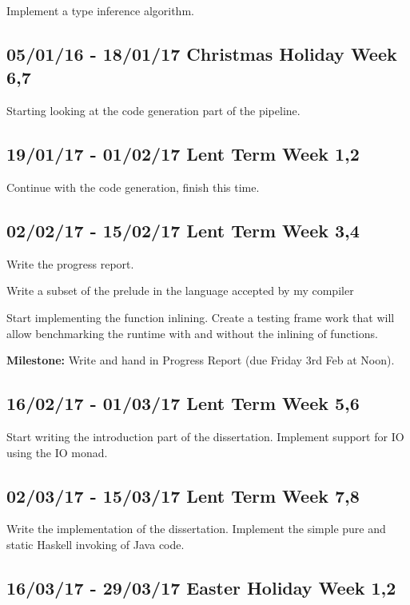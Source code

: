 \documentclass[a4paper]{article}
\begin{document}
      Implement a type inference algorithm.

    \subsection*{05/01/16 - 18/01/17 \hfill Christmas Holiday Week 6,7}

      Starting looking at the code generation part of the pipeline.


    \subsection*{19/01/17 - 01/02/17 \hfill Lent Term Week 1,2}

      Continue with the code generation, finish this time.


    \subsection*{02/02/17 - 15/02/17 \hfill Lent Term Week 3,4}


      Write the progress report.

      Write a subset of the prelude in the language accepted by my compiler

      Start implementing the function inlining. Create a testing frame work that will allow benchmarking the runtime with and without the 
      inlining of functions.


      \textbf{Milestone:} Write and hand in Progress Report (due Friday 3rd Feb at Noon).

    \subsection*{16/02/17 - 01/03/17 \hfill Lent Term Week 5,6}

      Start writing the introduction part of the dissertation. Implement support for IO using the IO monad.

    \subsection*{02/03/17 - 15/03/17 \hfill Lent Term Week 7,8}

      Write the implementation of the dissertation. Implement the simple pure and static Haskell invoking of Java code.


    \subsection*{16/03/17 - 29/03/17 \hfill Easter Holiday Week 1,2}
\end{document}
